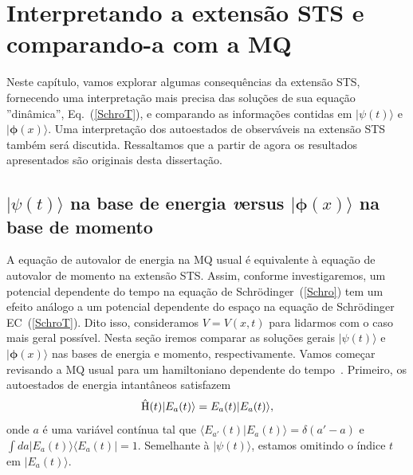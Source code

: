 \chapter{Interpretando a extensão STS e comparando-a com a MQ}
\label{chap:cap3}

Neste capítulo, vamos explorar algumas consequências da extensão STS, fornecendo uma interpretação mais precisa das soluções de sua equação ''dinâmica'', Eq.~(\ref{SchroT}), e comparando as informações contidas em $|\psi(t)\rangle $ e $|\pmb{\phi}(x)\rangle$. Uma interpretação dos autoestados de observáveis na extensão STS também será discutida. Ressaltamos que a partir de agora os resultados apresentados são originais desta dissertação.



\section{$|\psi(t)\rangle$ na base de energia {\textit versus} $|\pmb{\phi}(x)\rangle$ na base de momento}
\label{sec:bases}

A equação de autovalor de energia na MQ usual é equivalente à equação de autovalor de momento na extensão STS. Assim, conforme investigaremos, um potencial dependente do tempo na equação de Schrödinger~(\ref{Schro}) tem um efeito análogo a um potencial dependente do espaço na equação de Schrödinger EC~(\ref{SchroT}). Dito isso, consideramos $V=V(x,t)$ para lidarmos com o caso mais geral possível. Nesta seção iremos comparar as soluções gerais $|\psi(t)\rangle$ e $|\pmb{\phi}(x)\rangle$ nas bases de energia e momento, respectivamente. Vamos começar revisando a MQ usual para um hamiltoniano dependente do tempo~\cite{sakurai}. Primeiro, os autoestados de energia intantâneos satisfazem
\begin{equation}\label{SchroE1}
{\hat {\textrm H}}(t)|E_a(t)\rangle = E_a(t)|E_a(t)\rangle,
\end{equation}
onde $a$ é uma variável contínua tal que $\langle E_{a'}(t)|E_a(t)\rangle=\delta(a'-a)$ e $\int da |E_a(t)\rangle {\langle} E_a(t)|=1$. Semelhante à $|\psi(t)\rangle$, estamos omitindo o índice $t$ em $|E_a(t)\rangle$.


